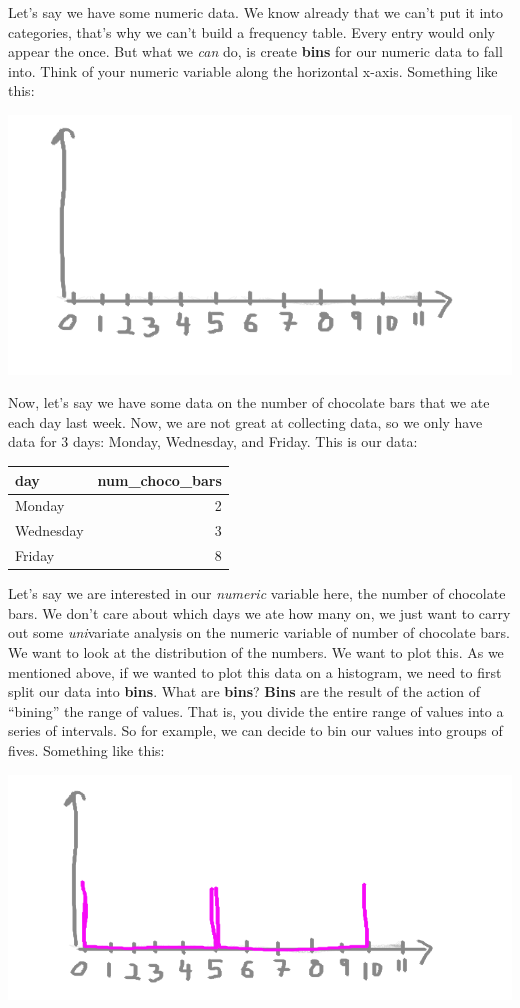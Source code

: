 \documentclass[
]{book}
\begin{document}
Let's say we have some numeric data. We know already that we can't put it into categories, that's why we can't build a frequency table. Every entry would only appear the once. But what we \emph{can} do, is create \textbf{bins} for our numeric data to fall into. Think of your numeric variable along the horizontal x-axis. Something like this:

\includegraphics{imgs/hist_blank_x.png}

Now, let's say we have some data on the number of chocolate bars that we ate each day last week. Now, we are not great at collecting data, so we only have data for 3 days: Monday, Wednesday, and Friday. This is our data:

\begin{tabular}{l|r}
\hline
day & num\_choco\_bars\\
\hline
Monday & 2\\
\hline
Wednesday & 3\\
\hline
Friday & 8\\
\hline
\end{tabular}

Let's say we are interested in our \emph{numeric} variable here, the number of chocolate bars. We don't care about which days we ate how many on, we just want to carry out some \emph{uni}variate analysis on the numeric variable of number of chocolate bars. We want to look at the distribution of the numbers. We want to plot this. As we mentioned above, if we wanted to plot this data on a histogram, we need to first split our data into \textbf{bins}. What are \textbf{bins}? \textbf{Bins} are the result of the action of ``bining'' the range of values. That is, you divide the entire range of values into a series of intervals. So for example, we can decide to bin our values into groups of fives. Something like this:

\includegraphics{imgs/hist_bins.png}
\end{document}
